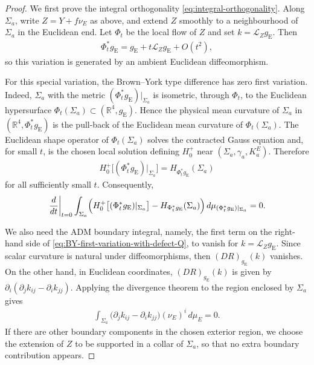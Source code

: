 \documentclass[10pt,a4paper]{amsart}
\newcommand{\gE}{g_{\mathrm{E}}}
\newcommand{\Lie}{\mathcal{L}}
\begin{document}
	\begin{proof}
		We first prove the integral orthogonality \eqref{eq:integral-orthogonality}. Along $\Sigma_a$, write
		$Z=Y+f\nu_E$ as above, and extend $Z$ smoothly to a neighbourhood of $\Sigma_a$ in the
		Euclidean end. Let $\Phi_t$ be the local flow of $Z$ and set
		$k=\Lie_Z\gE$. Then
		\begin{align*}
			\Phi_t^*\gE=\gE+t\Lie_Z\gE+O(t^2),
		\end{align*}
		so this variation is
		generated by an ambient Euclidean diffeomorphism.
		
		For this special variation, the Brown--York type difference has zero first
		variation. Indeed, $\Sigma_a$ with the metric $(\Phi_t^*\gE)|_{\Sigma_a}$ is
		isometric, through $\Phi_t$, to the Euclidean hypersurface
		$\Phi_t(\Sigma_a)\subset(\mathbb R^4,\gE)$. Hence the physical mean curvature
		of $\Sigma_a$ in $(\mathbb R^4,\Phi_t^*\gE)$ is the pull-back of the Euclidean
		mean curvature of $\Phi_t(\Sigma_a)$. The Euclidean shape operator of
		$\Phi_t(\Sigma_a)$ solves the contracted Gauss equation and, for small $t$, is
		the chosen local solution defining $H_0^+$ near
		$(\Sigma_a,\gamma_a,K_a^E)$. Therefore
		\begin{align}
			H_0^+\bigl[(\Phi_t^*\gE)|_{\Sigma_a}\bigr]
			=
			H_{\Phi_t^*\gE}(\Sigma_a)
		\end{align}
		for all sufficiently small $t$. Consequently,
		\begin{align}\label{eq:BY-defect-proof-zero-first-variation}
			\left.
			\frac{d}{dt}
			\right|_{t=0}
			\int_{\Sigma_a}
			\Bigl(
			H_0^+\bigl[(\Phi_t^*\gE)|_{\Sigma_a}\bigr]
			-
			H_{\Phi_t^*\gE}(\Sigma_a)
			\Bigr)
			\,d\mu_{(\Phi_t^*\gE)|_{\Sigma_a}}
			=
			0.
		\end{align}
		
		We also need the ADM boundary integral, namely, the first term on the right-hand side of \eqref{eq:BY-first-variation-with-defect-Q}, to vanish for
		$k=\Lie_Z\gE$. Since scalar curvature is natural under diffeomorphisms, then $(DR)_{\gE}(k)$ vanishes. On the other
		hand, in Euclidean coordinates,
		$(DR)_{\gE}(k)$ is given by $\partial_i(\partial_jk_{ij}-\partial_i k_{jj})$. Applying the
		divergence theorem to the region enclosed by $\Sigma_a$ gives
		\begin{align}\label{eq:BY-defect-proof-zero-ADM-boundary}
			\int_{\Sigma_a}
			\bigl(
			\partial_j k_{ij}
			-
			\partial_i k_{jj}
			\bigr)(\nu_E)^i\,d\mu_E
			=
			0 .
		\end{align}
		If there are other boundary components in the chosen exterior region, we choose
		the extension of $Z$ to be supported in a collar of $\Sigma_a$, so that no
		extra boundary contribution appears.
		

\end{proof}
\end{document}
